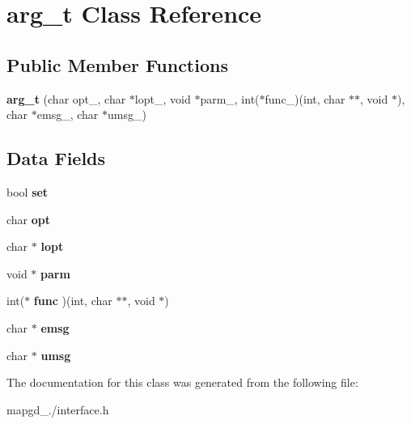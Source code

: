 \hypertarget{classarg__t}{\section{arg\-\_\-t Class Reference}
\label{classarg__t}
}
\subsection*{Public Member Functions}
\begin{DoxyCompactItemize}
\item 
\hypertarget{classarg__t_aa0816102885c0956f557ed2bb7789f83}{{\bfseries arg\-\_\-t} (char opt\-\_\-, char $\ast$lopt\-\_\-, void $\ast$parm\-\_\-, int($\ast$func\-\_\-)(int, char $\ast$$\ast$, void $\ast$), char $\ast$emsg\-\_\-, char $\ast$umsg\-\_\-)}\label{classarg__t_aa0816102885c0956f557ed2bb7789f83}

\end{DoxyCompactItemize}
\subsection*{Data Fields}
\begin{DoxyCompactItemize}
\item 
\hypertarget{classarg__t_a681d5790d7487a756d54d24d4a310611}{bool {\bfseries set}}\label{classarg__t_a681d5790d7487a756d54d24d4a310611}

\item 
\hypertarget{classarg__t_adf0074f9886f987e60fc9a111a22dc23}{char {\bfseries opt}}\label{classarg__t_adf0074f9886f987e60fc9a111a22dc23}

\item 
\hypertarget{classarg__t_a558ffc8c12be9cc9b6712e23925219c0}{char $\ast$ {\bfseries lopt}}\label{classarg__t_a558ffc8c12be9cc9b6712e23925219c0}

\item 
\hypertarget{classarg__t_a5395567b0a31949b094774ba6dc6c10d}{void $\ast$ {\bfseries parm}}\label{classarg__t_a5395567b0a31949b094774ba6dc6c10d}

\item 
\hypertarget{classarg__t_a1056d3714b616261fd36049495026cc0}{int($\ast$ {\bfseries func} )(int, char $\ast$$\ast$, void $\ast$)}\label{classarg__t_a1056d3714b616261fd36049495026cc0}

\item 
\hypertarget{classarg__t_aab8c1d692c18688ed3e01f04ca7e2ea3}{char $\ast$ {\bfseries emsg}}\label{classarg__t_aab8c1d692c18688ed3e01f04ca7e2ea3}

\item 
\hypertarget{classarg__t_a1e3b887bbd417a0339ec430878f3feac}{char $\ast$ {\bfseries umsg}}\label{classarg__t_a1e3b887bbd417a0339ec430878f3feac}

\end{DoxyCompactItemize}


The documentation for this class was generated from the following file\-:\begin{DoxyCompactItemize}
\item 
mapgd\-\_./interface.\-h\end{DoxyCompactItemize}
